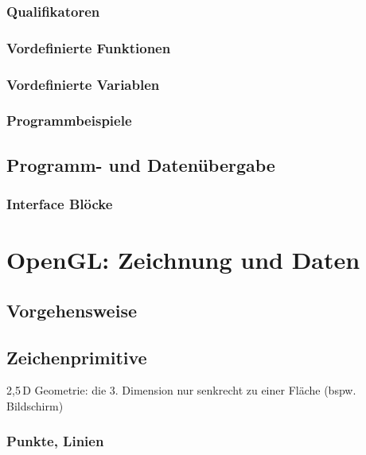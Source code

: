 \documentclass{scrreprt}
\begin{document}
\subsection{Qualifikatoren}

\subsection{Vordefinierte Funktionen}

\subsection{Vordefinierte Variablen}

\subsection{Programmbeispiele}

\section{Programm- und Datenübergabe}
\subsection{Interface Blöcke}

\chapter{OpenGL: Zeichnung und Daten}

\section{Vorgehensweise}

\section{Zeichenprimitive}

2,5\,D Geometrie: die 3. Dimension nur senkrecht zu einer Fläche (bspw. Bildschirm)

\subsection{Punkte, Linien}
\end{document}
